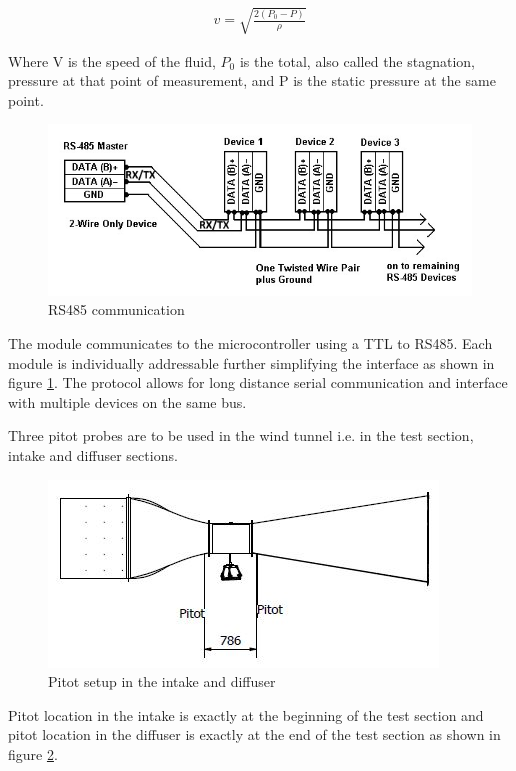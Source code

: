 \begin{ceqn}
	\begin{align}
		v = \sqrt{\frac{2(P_{0} - P)}{\rho}}
	\end{align}
\end{ceqn}

Where V is the speed of the fluid, $P_{0}$ is the total, also called the stagnation, pressure at that point of measurement, and P is the static pressure at the same point.

\begin{center}
	\begin{figure}[H]
		\centering
		\includegraphics{Figures/modbus}
		\caption[RS485 communication]{RS485 communication}
		\label{fig:rs485}
	\end{figure}
\end{center}
The module communicates to the microcontroller using a TTL to RS485. Each module is individually addressable further simplifying the interface as shown in figure \ref{fig:rs485}.
The protocol allows for long distance serial communication and interface with multiple devices on the same bus.

Three pitot probes are to be used in the wind tunnel i.e. in the test section, intake and diffuser sections.
\begin{center}
	\begin{figure}[H]
		\centering
		\includegraphics{Figures/wt and pitot.JPG}
		\caption[Pitot setup]{Pitot setup in the intake and diffuser}
		\label{pitot loc}
	\end{figure}
\end{center}
Pitot location in the intake is exactly at the beginning of the test section and pitot location in the diffuser
is exactly at the end of the test section as shown in figure \ref{pitot loc}.

